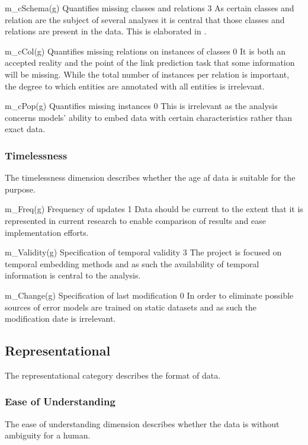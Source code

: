 \weighttable
{m_{cSchema}(g)}
{Quantifies missing classes and relations}
{3}
{As certain classes and relation are the subject of several analyses it is central that those classes and relations are present in the data. This is elaborated in \missing.}
{}

\weighttable
{m_{cCol}(g)}
{Quantifies missing relations on instances of classes}
{0}
{It is both an accepted reality and the point of the link prediction task that some information will be missing. While the total number of instances per relation is important, the degree to which entities are annotated with all entities is irrelevant.}
{}

\weighttable
{m_{cPop}(g)}
{Quantifies missing instances}
{0}
{This is irrelevant as the analysis concerns models' ability to embed data with certain characteristics rather than exact data.}
{}

\subsubsection{Timelessness}
The timelessness dimension describes whether the age af data is suitable for the purpose.

\weighttable
{m_{Freq}(g)}
{Frequency of updates}
{1}
{Data should be current to the extent that it is represented in current research to enable comparison of results and ease implementation efforts.}
{}

\weighttable
{m_{Validity}(g)}
{Specification of temporal validity}
{3}
{The project is focused on temporal embedding methods and as such the availability of temporal information is central to the analysis.}
{}

\weighttable
{m_{Change}(g)}
{Specification of last modification}
{0}
{In order to eliminate possible sources of error models are trained on static datasets and as such the modification date is irrelevant.}
{}

\subsection{Representational}
The representational category describes the format of data.

\subsubsection{Ease of Understanding}
The ease of understanding dimension describes whether the data is without ambiguity for a human.

